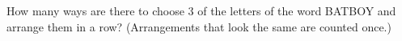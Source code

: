 How many ways are there to choose $3$ of the letters of the word BATBOY and arrange them in a row? (Arrangements that look the same are counted once.)
